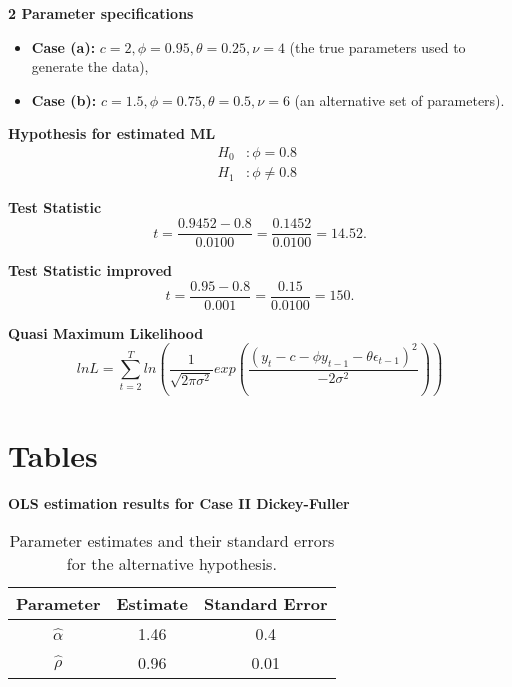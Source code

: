 \documentclass[12pt]{article}
\begin{document}
\textbf{2 Parameter specifications}
\begin{itemize}
    \item \textbf{Case (a):} $c = 2, \phi = 0.95, \theta = 0.25, \nu = 4$ (the true parameters used to generate the data),
    \item \textbf{Case (b):} $c = 1.5, \phi = 0.75, \theta = 0.5, \nu = 6$ (an alternative set of parameters).
    \label{specifica}
\end{itemize}

\textbf{Hypothesis for estimated ML}
\begin{equation}
\begin{aligned}
    H_0 &: \phi = 0.8 \, \ \\
    H_1 &: \phi \neq 0.8 \,
\end{aligned}
\label{eq:nullacht}
\end{equation}

\textbf{Test Statistic}
\begin{equation}
t = \frac{0.9452 - 0.8}{0.0100} = \frac{0.1452}{0.0100} = 14.52.
    \label{eq:tstatmlone}
\end{equation}

\textbf{Test Statistic improved}
\begin{equation}
t = \frac{0.95 - 0.8}{0.001} = \frac{0.15}{0.0100} = 150.
    \label{eq:tstatmltwo}
\end{equation}

\textbf{Quasi Maximum Likelihood}
 \begin{equation}
     ln L = \sum_{t=2}^{T} ln (\frac{1}{\sqrt{2\pi \sigma^2}} exp(\frac{(y_t -c -\phi y_{t-1} - \theta \epsilon_{t-1})^2}{-2 \sigma^2} ))
     \label{eq:QML}
 \end{equation}

\newpage
\section{Tables}
\textbf{OLS estimation results for Case II Dickey-Fuller}
\begin{table}[h!]
\centering
\begin{tabular}{|c|c|c|}
\hline
\textbf{Parameter} & \textbf{Estimate} & \textbf{Standard Error} \\ \hline
$\hat{\alpha}$     & 1.46              & 0.4                     \\ \hline
$\hat{\rho}$       & 0.96              & 0.01                    \\ \hline
\end{tabular}
\caption{Parameter estimates and their standard errors for the alternative hypothesis.}
\label{tab:parameter_estimates}
\end{table}
\end{document}
